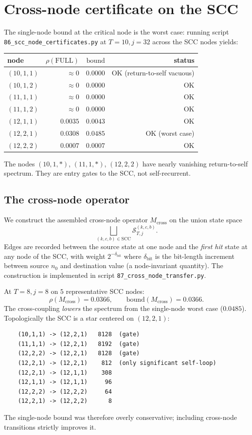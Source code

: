 \documentclass[11pt,a4paper]{article}
\theoremstyle{definition}
\newcommand{\full}{\mathrm{FULL}}
\newcommand{\spec}{\rho}
\begin{document}
\section{Cross-node certificate on the SCC}
\label{sec:cross}

The single-node bound at the critical node is the worst case:
running script \verb|86_scc_node_certificates.py| at $T=10, j=32$
across the SCC nodes yields:

\begin{center}
\begin{tabular}{lrrr}
\toprule
node & $\spec(\full)$ & $\mathrm{bound}$ & status \\
\midrule
$(10,1,1)$ & $\approx 0$ & $0.0000$ & OK (return-to-self vacuous) \\
$(10,1,2)$ & $\approx 0$ & $0.0000$ & OK \\
$(11,1,1)$ & $\approx 0$ & $0.0000$ & OK \\
$(11,1,2)$ & $\approx 0$ & $0.0000$ & OK \\
$(12,1,1)$ & $0.0035$  & $0.0043$ & OK \\
$(12,2,1)$ & $0.0308$  & $0.0485$ & OK (worst case) \\
$(12,2,2)$ & $0.0007$  & $0.0007$ & OK \\
\bottomrule
\end{tabular}
\end{center}

The nodes $(10, 1, *)$, $(11, 1, *)$, $(12, 2, 2)$ have nearly
vanishing return-to-self spectrum. They are entry gates to the SCC,
not self-recurrent.

\subsection{The cross-node operator}

We construct the assembled cross-node operator $M_{\mathrm{cross}}$
on the union state space
\[
\bigsqcup_{(k,c,b) \in \mathrm{SCC}} \mathcal{S}_{T,j}^{(k,c,b)}.
\]
Edges are recorded between the source state at one node and the
\emph{first hit} state at any node of the SCC, with weight
$2^{-\delta_{\mathrm{bit}}}$ where $\delta_{\mathrm{bit}}$ is the
bit-length increment between source $n_0$ and destination value (a
node-invariant quantity). The construction is implemented in
script \verb|87_cross_node_transfer.py|.

At $T=8, j=8$ on $5$ representative SCC nodes:
\[
\spec(M_{\mathrm{cross}}) = 0.0366, \qquad
\mathrm{bound}(M_{\mathrm{cross}}) = 0.0366.
\]
The cross-coupling \emph{lowers} the spectrum from the single-node
worst case ($0.0485$). Topologically the SCC is a star centered on
$(12,2,1)$:
\begin{verbatim}
    (10,1,1) -> (12,2,1)   8128  (gate)
    (11,1,1) -> (12,2,1)   8192  (gate)
    (12,2,2) -> (12,2,1)   8128  (gate)
    (12,2,1) -> (12,2,1)    812  (only significant self-loop)
    (12,2,1) -> (12,1,1)    308
    (12,1,1) -> (12,1,1)     96
    (12,2,2) -> (12,2,2)     64
    (12,2,1) -> (12,2,2)      8
\end{verbatim}
The single-node bound was therefore overly conservative; including
cross-node transitions strictly improves it.
\end{document}
